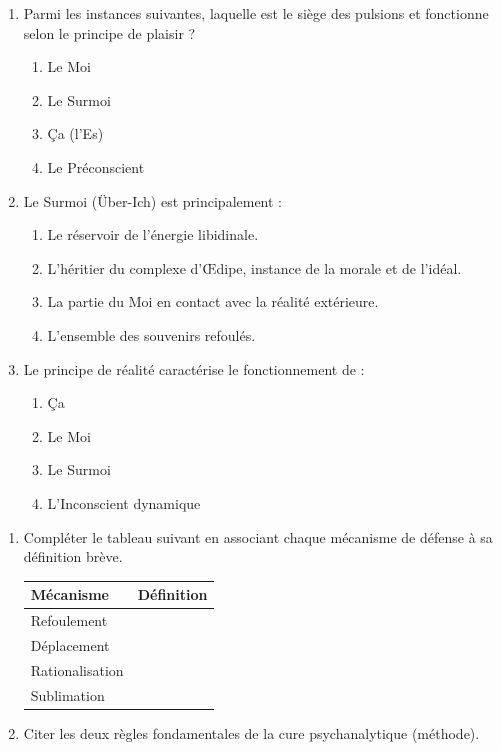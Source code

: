 \documentclass[11pt]{article}
\begin{document}
\begin{exercice}
\begin{enumerate}
    \item Parmi les instances suivantes, laquelle est le siège des pulsions et fonctionne selon le principe de plaisir ?
    \begin{enumerate}
        \item Le Moi
        \item Le Surmoi
        \item Ça (l'Es)
        \item Le Préconscient
    \end{enumerate}
    \item Le Surmoi (Über-Ich) est principalement :
    \begin{enumerate}
        \item Le réservoir de l'énergie libidinale.
        \item L'héritier du complexe d'Œdipe, instance de la morale et de l'idéal.
        \item La partie du Moi en contact avec la réalité extérieure.
        \item L'ensemble des souvenirs refoulés.
    \end{enumerate}
    \item Le principe de réalité caractérise le fonctionnement de :
    \begin{enumerate}
        \item Ça
        \item Le Moi
        \item Le Surmoi
        \item L'Inconscient dynamique
    \end{enumerate}
\end{enumerate}
\end{exercice}

\begin{exercice}
\begin{enumerate}
    \item Compléter le tableau suivant en associant chaque mécanisme de défense à sa définition brève.
    \begin{center}
    \begin{tabular}{|l|p{8cm}|}
    \hline
    \textbf{Mécanisme} & \textbf{Définition} \\
    \hline
    Refoulement & \dotfill \\
    \hline
    Déplacement & \dotfill \\
    \hline
    Rationalisation & \dotfill \\
    \hline
    Sublimation & \dotfill \\
    \hline
    \end{tabular}
    \end{center}
    \item Citer les deux règles fondamentales de la cure psychanalytique (méthode).
\end{enumerate}
\end{exercice}
\end{document}
